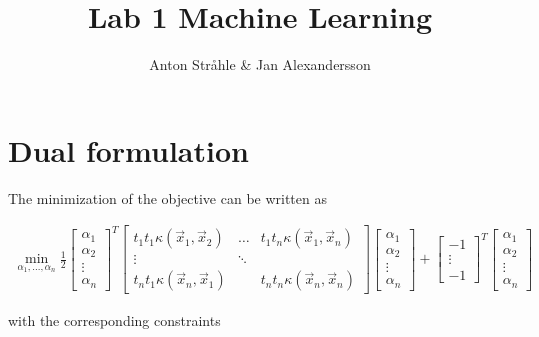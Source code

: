 \documentclass{article}
\begin{document}
\title{Lab 1 Machine Learning}
\author{Anton Stråhle \& Jan Alexandersson}
\maketitle 

\section*{Dual formulation}

The minimization of the objective can be written as

\begin{align*}
\min_{\alpha_1,...,\alpha_n} \frac{1}{2}
 \begin{bmatrix}
\alpha_1 \\
\alpha_2 \\
\vdots \\
\alpha_n 
\end{bmatrix}^{T}
 \begin{bmatrix}
t_1 t_1 \kappa (\vec{x}_1, \vec{x}_2) & \hdots & t_1 t_n \kappa (\vec{x}_1, \vec{x}_n) \\
\vdots & \ddots & \\
t_n t_1 \kappa (\vec{x}_n, \vec{x}_1) &  & t_n t_n \kappa (\vec{x}_n, \vec{x}_n)
\end{bmatrix}
\begin{bmatrix}
\alpha_1 \\
\alpha_2 \\
\vdots \\
\alpha_n 
\end{bmatrix}
+
\begin{bmatrix}
-1 \\
\vdots \\
-1 
\end{bmatrix}^{T}
\begin{bmatrix}
\alpha_1 \\
\alpha_2 \\
\vdots \\
\alpha_n 
\end{bmatrix}
\end{align*}

with the corresponding constraints
\end{document}
